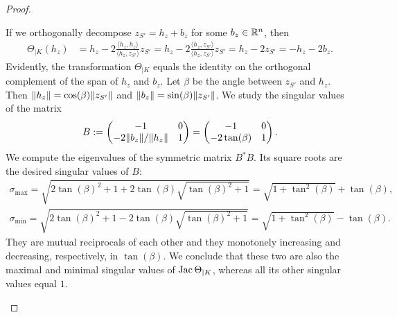 \documentclass[10pt,a4paper]{article}
\begin{document}
\begin{proof}
\begin{itemize}
        If we orthogonally decompose $z_{S'} = h_{z} + b_{z}$ for some $b_{z} \in {\mathbb R}^{n}$, then 
        \begin{align*}
            \Theta_{|K}( h_{z} ) 
            &= 
            h_{z}
            - 
            2 \frac{\langle h_{z}, h_{z} \rangle}{\langle h_{z}, z_{S'} \rangle} z_{S'}
            = 
            h_{z}
            - 
            2 \frac{\langle h_{z}, z_{S'} \rangle}{\langle h_{z}, z_{S'} \rangle} z_{S'}
            = 
            h_{z}
            - 
            2 z_{S'}
            = 
            - h_{z}
            - 
            2 b_{z}
            .
        \end{align*}
		Evidently, the transformation $\Theta_{|K}$ equals the identity on the orthogonal complement of the span of $h_{z}$ and $b_{z}$. 
		Let $\beta$ be the angle between $z_{S'}$ and $h_{z}$. 
        Then $\|  h_{z}  \| = \cos(\beta) \|  z_{S'}  \|$ and $\|  b_{z}  \| = \sin(\beta) \|  z_{S'}  \|$. 
        We study the singular values of the matrix 
        \begin{align*}
            B 
            := 
            \begin{pmatrix}
            -1                 & 0
            \\ 
            -2 \|  b_{z}  \|/\|  h_{z}  \| & 1
            \end{pmatrix}
            =
            \begin{pmatrix}
            -1             & 0
            \\ 
            -2 \tan(\beta) & 1
            \end{pmatrix}
            .
        \end{align*}
        We compute the eigenvalues of the symmetric matrix $B^{\ast} B$. 
        Its square roots are the desired singular values of $B$:
        \begin{align*}
            \sigma_{\max} = \sqrt{ 2\tan(\beta)^2 + 1 + 2 \tan(\beta) \sqrt{ \tan(\beta)^2 + 1 } } = \sqrt{ 1 + \tan^{2}(\beta) } + \tan(\beta)
            ,
            \\
            \sigma_{\min} = \sqrt{ 2\tan(\beta)^2 + 1 - 2 \tan(\beta) \sqrt{ \tan(\beta)^2 + 1 } } = \sqrt{ 1 + \tan^{2}(\beta) } - \tan(\beta)
            .
        \end{align*}
        They are mutual reciprocals of each other and they monotonely increasing and decreasing, respectively, in $\tan(\beta)$.
        We conclude that these two are also the maximal and minimal singular values of $\operatorname{{\rm Jac}}\Theta_{|K}$,
        whereas all its other singular values equal $1$. 
        

\end{itemize}
\end{proof}
\end{document}

